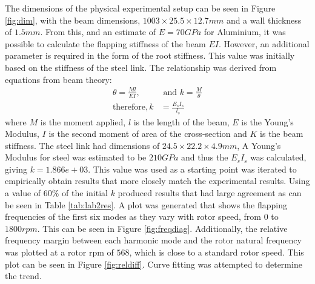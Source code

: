 \documentclass[11pt]{article}
\begin{document}
The dimensions of the physical experimental setup can be seen in Figure \ref{fig:dim}, with the beam dimensions, $1003 \times 25.5 \times 12.7 mm$ and a wall thickness of $1.5 mm$. From this, and an estimate of $E=70GPa$ for Aluminium, it was possible to calculate the flapping stiffness of the beam $EI$. However, an additional parameter is required in the form of the root stiffness. This value was initially based on the stiffness of the steel link. The relationship was derived from equations from beam theory:
\begin{align}
    \theta=\frac{Ml}{EI},& \text{ and }
    k=\frac{M}{\theta}\\
    \text{therefore}, k&=\frac{E_s I_s}{l_s}
\end{align}{}
where $M$ is the moment applied, $l$ is the length of the beam, $E$ is the Young's Modulus, $I$ is the second moment of area of the cross-section and $K$ is the beam stiffness. The steel link had dimensions of $24.5 \times 22.2 \times 4.9 mm$, A Young's Modulus for steel was estimated to be $210GPa$ and thus the $E_s I_s$ was calculated, giving $k=1.866e+03$. This value was used as a starting point was iterated to empirically obtain results that more closely match the experimental results. Using a value of $60\%$ of the initial $k$ produced results that had large agreement as can be seen in Table \ref{tab:lab2res}. A plot was generated that shows the flapping frequencies of the first six modes as they vary with rotor speed, from $0$ to $1800 rpm$. This can be seen in Figure \ref{fig:freqdiag}. Additionally, the relative frequency margin between each harmonic mode  and the rotor natural frequency was plotted at a rotor rpm of $568$, which is close to a standard rotor speed. This plot can be seen in Figure \ref{fig:reldiff}. Curve fitting was attempted to determine the trend.
\end{document}
